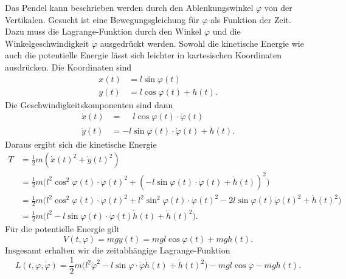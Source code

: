 Das Pendel kann beschrieben werden durch den Ablenkungswinkel $\varphi$
von der Vertikalen.
Gesucht ist eine Bewegungsgleichung für $\varphi$ als Funktion der Zeit.
Dazu muss die Lagrange-Funktion durch den Winkel $\varphi$ und die
Winkelgeschwindigkeit $\dot{\varphi}$ ausgedrückt werden.
Sowohl die kinetische Energie wie auch die potentielle Energie lässt
sich leichter in kartesischen Koordinaten ausdrücken.
Die Koordinaten sind
\begin{align*}
x(t)
&=
l \sin\varphi(t)
\\
y(t)
&=
l \cos\varphi(t) + h(t).
\end{align*}
Die Geschwindigkeitskomponenten sind dann
\begin{align*}
\dot{x}(t) &= \phantom{-}l \cos\varphi(t)\cdot \dot{\varphi}(t) \\
\dot{y}(t) &=          - l \sin\varphi(t)\cdot \dot{\varphi}(t) + \dot{h}(t).
\end{align*}
Daraus ergibt sich die kinetische Energie
\begin{align*}
T
&=
\frac12
m(\dot{x}(t)^2 + \dot{y}(t)^2)
\\
&=
\frac12m\bigl(
l^2 \cos^2 \varphi(t)\cdot\dot{\varphi}(t)^2
+
(-l\sin\varphi(t)\cdot\dot{\varphi}(t) + \dot{h}(t))^2
\bigr)
\\
&=
\frac12m\bigl(
l^2 \cos^2\varphi(t)\cdot\dot{\varphi}(t)^2
+
l^2 \sin^2\varphi(t)\cdot\dot{\varphi}(t)^2
-
2l\sin\varphi(t)\dot{\varphi}(t)^2
+
\dot{h}(t)^2
\bigr)
\\
&=
\frac12m\bigl(
l^2
-
l\sin \varphi(t)\cdot \dot{\varphi}(t)\dot{h}(t) + \dot{h}(t)^2
\bigr)
.
\end{align*}
Für die potentielle Energie gilt
\[
V(t,\varphi)
=
mgy(t)
=
mgl\cos\varphi(t) + mgh(t).
\]
Insgesamt erhalten wir die zeitabhängige Lagrange-Funktion
\[
L(t,\varphi,\dot{\varphi})
=
\frac12m\bigl(
l^2\dot{\varphi}^2
-
l\sin \varphi\cdot \dot{\varphi}\dot{h}(t) + \dot{h}(t)^2
\bigr)
-
mgl\cos\varphi - mgh(t).
\]

%
%
